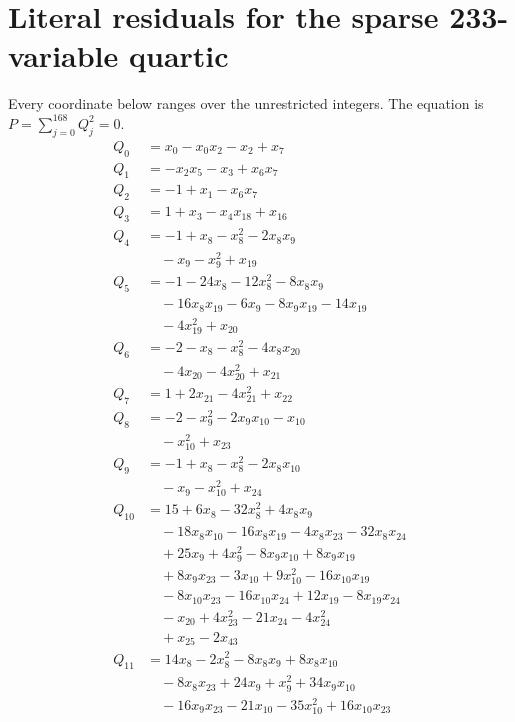 \section{Literal residuals for the sparse 233-variable quartic}
Every coordinate below ranges over the unrestricted integers. The equation is $P=\sum_{j=0}^{168}Q_j^2=0$.
\begingroup\footnotesize\allowdisplaybreaks[4]
\begin{align*}
Q_{0}&=x_{0}-x_{0}x_{2}-x_{2}+x_{7}\\
Q_{1}&=-x_{2}x_{5}-x_{3}+x_{6}x_{7}\\
Q_{2}&=-1+x_{1}-x_{6}x_{7}\\
Q_{3}&=1+x_{3}-x_{4}x_{18}+x_{16}\\
Q_{4}&=-1+x_{8}-x_{8}^{2}-2x_{8}x_{9}\\
&\quad -x_{9}-x_{9}^{2}+x_{19}\\
Q_{5}&=-1-24x_{8}-12x_{8}^{2}-8x_{8}x_{9}\\
&\quad -16x_{8}x_{19}-6x_{9}-8x_{9}x_{19}-14x_{19}\\
&\quad -4x_{19}^{2}+x_{20}\\
Q_{6}&=-2-x_{8}-x_{8}^{2}-4x_{8}x_{20}\\
&\quad -4x_{20}-4x_{20}^{2}+x_{21}\\
Q_{7}&=1+2x_{21}-4x_{21}^{2}+x_{22}\\
Q_{8}&=-2-x_{9}^{2}-2x_{9}x_{10}-x_{10}\\
&\quad -x_{10}^{2}+x_{23}\\
Q_{9}&=-1+x_{8}-x_{8}^{2}-2x_{8}x_{10}\\
&\quad -x_{9}-x_{10}^{2}+x_{24}\\
Q_{10}&=15+6x_{8}-32x_{8}^{2}+4x_{8}x_{9}\\
&\quad -18x_{8}x_{10}-16x_{8}x_{19}-4x_{8}x_{23}-32x_{8}x_{24}\\
&\quad +25x_{9}+4x_{9}^{2}-8x_{9}x_{10}+8x_{9}x_{19}\\
&\quad +8x_{9}x_{23}-3x_{10}+9x_{10}^{2}-16x_{10}x_{19}\\
&\quad -8x_{10}x_{23}-16x_{10}x_{24}+12x_{19}-8x_{19}x_{24}\\
&\quad -x_{20}+4x_{23}^{2}-21x_{24}-4x_{24}^{2}\\
&\quad +x_{25}-2x_{43}\\
Q_{11}&=14x_{8}-2x_{8}^{2}-8x_{8}x_{9}+8x_{8}x_{10}\\
&\quad -8x_{8}x_{23}+24x_{9}+x_{9}^{2}+34x_{9}x_{10}\\
&\quad -16x_{9}x_{23}-21x_{10}-35x_{10}^{2}+16x_{10}x_{23}\\

\end{align*}
